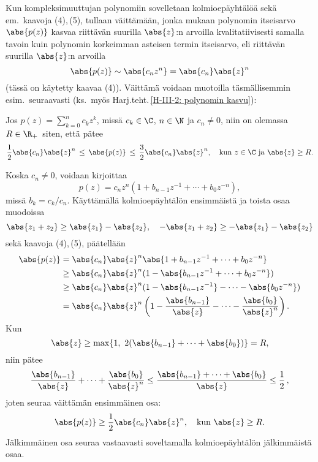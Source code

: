 Kun kompleksimuuttujan polynomiin sovelletaan kolmioepäyhtälöä sekä em.\ kaavoja (4),\,(5), 
tullaan väittämään, jonka mukaan polynomin itseisarvo $\abs{p(z)}$ kasvaa riittävän suurilla 
$\abs{z}$:n arvoilla kvalitatiivisesti samalla tavoin kuin polynomin korkeimman asteisen
termin itseisarvo, eli riittävän suurilla $\abs{z}$:n arvoilla
\[ 
\abs{p(z)} \sim \abs{c_n z^n} = \abs{c_n}\abs{z}^n 
\]
(tässä on käytetty kaavaa (4)). Väittämä voidaan muotoilla täsmällisemmin esim.\ seuraavasti
(ks.\ myös Harj.teht.\,\ref{H-III-2: polynomin kasvu}):
\begin{Prop} \label{polynomin kasvu}  Jos 
$p(z) = \sum_{k=0}^{n} c_k z^k$, missä  $c_k \in \C$, $n \in \N$ ja $c_n \neq 0$, niin on
olemassa $R \in \R_+\,$ siten, että pätee
\[
\frac{1}{2}\abs{c_n}\abs{z}^n\,\le\,\abs{p(z)}\,\le\,\frac{3}{2}\abs{c_n}\abs{z}^n,\quad 
                                        \text{kun} \ z \in \C\ \text{ja}\ \abs{z} \ge R.
\]
\end{Prop}
\tod Koska $c_n \neq 0$, voidaan kirjoittaa
\[
p(z) = c_n z^n(1 + b_{n-1}z^{-1} + \cdots + b_0z^{-n}),
\]
missä $b_k = c_k / c_n$. Käyttämällä kolmioepäyhtälön ensimmäistä ja toista osaa muodoissa
\[
\abs{z_1+z_2} \ge \abs{z_1}-\abs{z_2}, \quad -\abs{z_1 + z_2} \geq - \abs{z_1} - \abs{z_2}
\]
sekä kaavoja (4),\,(5), päätellään
\begin{align*}
\abs{p(z)} &=   \abs{c_n}\abs{z}^n \abs{1 + b_{n-1}z^{-1} + \cdots + b_0 z^{-n}} \\
           &\ge   \abs{c_n}\abs{z}^n (1 - \abs{b_{n-1}z^{-1} + \cdots + b_0 z^{-n}}) \\
           &\ge \abs{c_n}\abs{z}^n (1 - \abs{b_{n-1}z^{-1}} - \cdots - \abs{b_0 z^{-n}}) \\
           &= \abs{c_n}\abs{z}^n \left(1 - \frac{\abs{b_{n-1}}}{\abs{z}} - \cdots 
                                                     - \frac{\abs{b_0}}{\abs{z}^{n}}\right).
\end{align*}
Kun
\[
\abs{z} \geq \max \{1, \ 2(\abs{b_{n-1}} + \cdots + \abs{b_0}) \} = R,
\]
niin pätee
\[
\frac{\abs{b_{n-1}}}{\abs{z}} + \cdots + \frac{\abs{b_0}}{\abs{z}^n} \leq
\frac{\abs{b_{n-1}} + \cdots + \abs{b_0}}{\abs{z}} \leq \frac{1}{2}\,,
\]
joten seuraa väittämän ensimmäinen osa:
\[
\abs{p(z)} \ge \frac{1}{2} \abs{c_n}\abs{z}^n, \quad \text{kun} \ \abs{z} \geq R.
\]
Jälkimmäinen osa seuraa vastaavasti soveltamalla kolmioepäyhtälön jälkimmäistä osaa. \loppu
